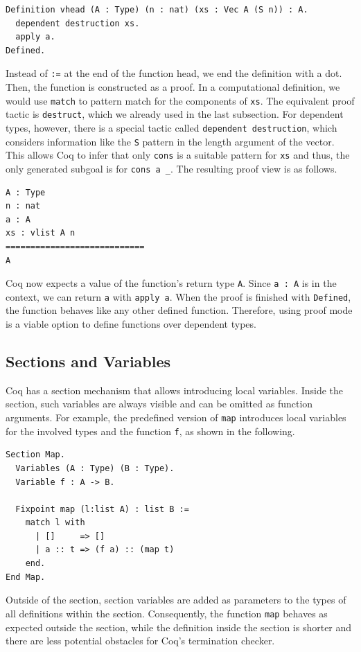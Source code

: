 \documentclass[a4paper, 11pt, fleqn, twoside, abstract=on]{scrreprt}
\newcommand{\cinl}[1]{\texttt{#1}}
\begin{document}
\begin{verbatim}
Definition vhead (A : Type) (n : nat) (xs : Vec A (S n)) : A.
  dependent destruction xs.
  apply a.
Defined.
\end{verbatim}

Instead of \cinl{:=} at the end of the function head, we end the definition with a dot.
Then, the function is constructed as a proof.
In a computational definition, we would use \cinl{match} to pattern match for the components of \cinl{xs}.
The equivalent proof tactic is \cinl{destruct}, which we already used in the last subsection.
For dependent types, however, there is a special tactic called \cinl{dependent destruction}, which considers information like the \cinl{S} pattern in the length argument of the vector.
This allows Coq to infer that only \cinl{cons} is a suitable pattern for \cinl{xs} and thus, the only generated subgoal is for \cinl{cons a _}.
The resulting proof view is as follows.

\begin{verbatim}
A : Type
n : nat
a : A
xs : vlist A n
============================
A
\end{verbatim}
\noindent
Coq now expects a value of the function's return type \cinl{A}.
Since \cinl{a : A} is in the context, we can return \cinl{a} with \cinl{apply a}.
When the proof is finished with \cinl{Defined}, the function behaves like any other defined function.
Therefore, using proof mode is a viable option to define functions over dependent types.

\subsection{Sections and Variables}
Coq has a section mechanism that allows introducing local variables.
Inside the section, such variables are always visible and can be omitted as function arguments.
For example, the predefined version of \cinl{map} introduces local variables for the involved types and the function \cinl{f}, as shown in the following.

\begin{verbatim}
Section Map.
  Variables (A : Type) (B : Type).
  Variable f : A -> B.

  Fixpoint map (l:list A) : list B :=
    match l with
      | []     => []
      | a :: t => (f a) :: (map t)
    end.
End Map.
\end{verbatim}

Outside of the section, section variables are added as parameters to the types of all definitions within the section.
Consequently, the function \cinl{map} behaves as expected outside the section, while the definition inside the section is shorter and there are less potential obstacles for Coq's termination checker.
\pagebreak
\end{document}
